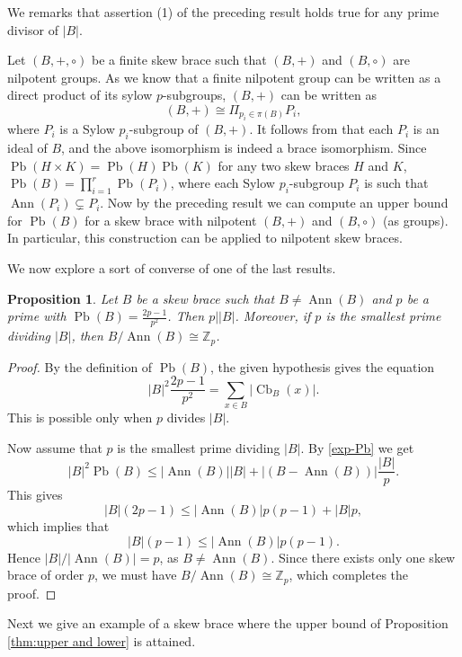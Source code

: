 \documentclass[oneside]{amsart}
\numberwithin{equation}{section}
\theoremstyle{plain}
\newtheorem{pro}[equation]{Proposition}
\theoremstyle{definition}
\newcommand{\Cb}{\operatorname{Cb} }
\newcommand{\Pb}{\operatorname{Pb} }
\newcommand{\Ann}{\operatorname{Ann} }
\begin{document}
 We remarks that assertion (1) of the preceding result holds true for any prime divisor of $|B|$.  
 
     Let $(B, +, \circ)$ be a finite skew brace such that $(B,+)$ and $(B, \circ)$ are nilpotent groups. 
     As we know that a finite nilpotent group can be written as a  direct product of its sylow $p$-subgroups, $(B, +)$ can be written as
      $$(B, +) \cong \Pi_{p_i \in \pi(B)}P_i,$$
where $P_i$ is a Sylow $p_i$-subgroup of $(B, +)$. 
     It follows from  \cite[Corollary 4.3]{CSV19} that each $P_i$ is an ideal of $B$, and the above isomorphism is indeed a brace isomorphism. Since $\Pb(H \times K) = \Pb(H) \Pb(K)$ for any two skew braces $H$ and $K$,  $\Pb(B) = \prod_{i=1}^{r}\Pb(P_i)$, where each Sylow $p_i$-subgroup $P_i$ is such that $\Ann(P_i) \subsetneq P_i$. Now by the preceding result we can compute an upper bound for $\Pb(B)$ for a skew brace with nilpotent $(B, +)$ and $(B, \circ)$ (as groups). In particular, this construction can be applied to nilpotent skew braces. 


We now explore  a sort of converse of one of the last results.
\begin{pro}
Let $B$ be a skew brace such that $B \neq \Ann(B)$ and $p$ be a prime with $\Pb(B)= \frac{2p-1}{p^2}$. Then $p||B|$. Moreover, if $p$ is the smallest prime  dividing $|B|$, then $B/\Ann(B)\cong \mathbb{Z}_p$.
\end{pro}
\begin{proof}
      By the definition of $\Pb(B)$, the given hypothesis gives the equation
    $$|B|^2 \frac{2p-1}{p^2} =\sum_{x\in B}|\Cb_{B}(x)|.$$
    This is possible only when $p$ divides $|B|$.

 Now assume that $p$ is the smallest prime dividing $|B|$. By \eqref{exp-Pb} we get
 $$|B|^2\Pb(B)\leqslant|\Ann(B)||B|+|(B-\Ann(B))|\frac{|B|}{p}.$$
   This gives
         $$|B|(2p-1)\leqslant |\Ann(B)|p(p-1) + |B|p,$$
          which implies that 
            $$|B|(p-1)\leqslant |\Ann(B)|p(p-1).$$
Hence $|B|/|\Ann(B)|= p$,  as $B \neq \Ann(B)$. Since there exists only one skew  brace of order $p$, we must have   $B/\Ann(B)\cong \mathbb{Z}_p$, which completes the proof.      
\end{proof}



Next we give an example of a skew brace where the upper bound of  Proposition \ref{thm:upper and lower} is attained.
\end{document}
